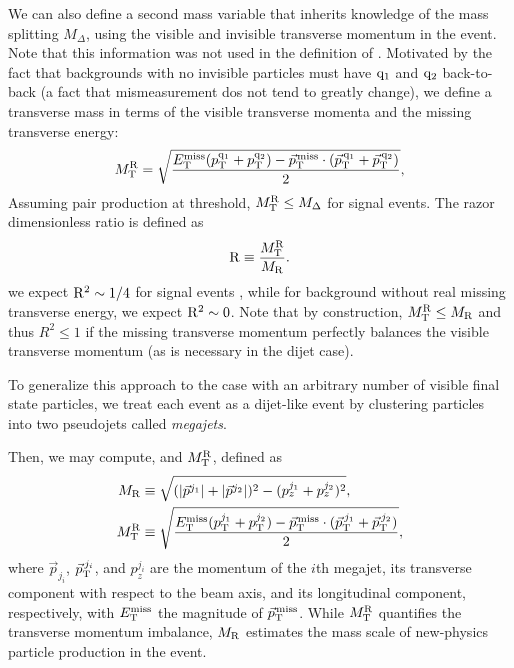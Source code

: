We can also define a second mass variable that inherits knowledge of
the mass splitting $M_{\Delta}$, using the visible and invisible transverse
momentum in the event. Note that this information was not used in the
definition of \MR. Motivated by the fact that backgrounds with no
invisible particles must have $\mathrm{q}_1$ and $\mathrm{q}_2$ back-to-back (a fact
that mismeasurement dos not tend to greatly change), we define a
transverse mass in terms of the visible transverse momenta and the
missing transverse energy:
\begin{equation}
M_\mathrm{T}^\mathrm{R} = \sqrt{ \frac{E_{\mathrm{T}}^{\text{miss}}(p_{\mathrm{T}}^{\mathrm{q}_1}+p_{\mathrm{T}}^{\mathrm{q}_2}) -
{\vec p}_{\mathrm{T}}^{\kern1pt\text{miss}} \cdot
 ({\vec p}_{\mathrm{T}}^{\,\mathrm{q}_1}+{\vec p}_{\mathrm{T}}^{\,\mathrm{q}_2}) }{2}},
\end{equation}
Assuming pair production at threshold, $M_\mathrm{T}^\mathrm{R} \leq M_{\Delta}$ for
signal events. The razor dimensionless ratio is defined as
\begin{equation}
\mathrm{R} \equiv \frac{M_\mathrm{T}^\mathrm{R}}{M_\mathrm{R}}.
\end{equation} 
we expect $\mathrm{R}^2\sim 1/4$ for signal events , while for background
without real missing transverse energy, we expect $\mathrm{R}^2 \sim 0$. Note
that by construction, $M_\mathrm{T}^\mathrm{R} \leq M_\mathrm{R}$ and thus $R^2\leq 1$ if the
missing transverse momentum perfectly balances the visible transverse momentum
(as is necessary in the dijet case).

To generalize this approach to the case with an arbitrary number of visible
final state particles, we treat each event
as a dijet-like event by clustering particles into two pseudojets
called \emph{megajets}. 

Then, we may compute, \MR and $M_\mathrm{T}^\mathrm{R}$, defined as
\begin{align}
 \label{eq:MRstar}
 M_\mathrm{R} &\equiv
 \sqrt{
(\lvert \vec{p}^{j_{1}} \rvert+\lvert \vec{p}^{j_{2}} \rvert)^2 -({p}^{j_1}_z+{p}^{j_2}_z)^2},\\
M_\mathrm{T}^\mathrm{R} &\equiv \sqrt{ \frac{E_{\mathrm{T}}^{\text{miss}}(p_{\mathrm{T}}^{j_1}+p_{\mathrm{T}}^{j_2}) -
{\vec p}_{\mathrm{T}}^{\kern1pt\text{miss}} \cdot
 ({\vec p}_{\mathrm{T}}^{\,j_1}+{\vec p}_{\mathrm{T}}^{\,j_2}) }{2}},
\end{align}
where $\vec{p}_{j_i}$, ${\vec p}_{\mathrm{T}}^{\,j_i}$, and
$p^{j_i}_z$ are the momentum of the $i$th megajet, its
transverse component with respect to the beam axis, and its
longitudinal component, respectively, with $E_{\mathrm{T}}^{\text{miss}}$ the magnitude of ${\vec p}_{\mathrm{T}}^{\kern1pt\text{miss}}$. While
$M_\mathrm{T}^\mathrm{R}$ quantifies the transverse momentum imbalance,
$M_\mathrm{R}$ estimates the mass scale of new-physics particle
production in the event. 


